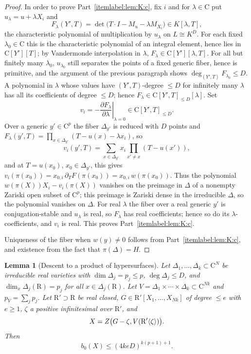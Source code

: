 \documentclass[10pt]{amsart}
\newtheorem{lemma}{Lemma}[section]
\theoremstyle{definition}
\theoremstyle{remark}
\numberwithin{equation}{section}
\newcommand {\R} {\mathrm{R}}
\newcommand {\C}     {\mathrm{C}}
\newcommand {\ZZ} {{\rm Z}}
\newcommand{\Rz}{\R'\langle\zeta\rangle}
\begin{document}
\begin{proof}
In order to prove Part~\eqref{itemlabel:lem:K:c}, fix $i$ and for $\lambda\in\C$ put $u_\lambda=u+\lambda X_i$ and
\[
F_\lambda(Y',T)=\det\bigl(T\cdot I-M_u-\lambda M_{X_i}\bigr)\in K[\lambda,T],
\]
the characteristic polynomial of multiplication by $u_\lambda$ on $L\cong K^D$. For each fixed $\lambda_0\in\C$ this is the characteristic polynomial of an integral element, hence lies in $\C[Y'][T]$; by Vandermonde interpolation in $\lambda$, $F_\lambda\in\C[Y'][\lambda,T]$. For all but finitely many $\lambda_0$, $u_{\lambda_0}$ still separates the points of a fixed generic fiber, hence is primitive, and the argument of the previous paragraph shows $\deg_{(Y',T)}F_{\lambda_0}\le D$. A polynomial in $\lambda$ whose values have $(Y',T)$-degree $\le D$ for infinitely many $\lambda$ has all its coefficients of degree $\le D$; hence $F_\lambda\in\C[Y',T]_{\le D}[\lambda]$. Set
\[
v_i=-\left.\frac{\partial F_\lambda}{\partial\lambda}\right|_{\lambda=0}\in\C[Y',T]_{\le D}.
\]
Over a generic $y'\in\C^p$ the fiber $\Delta_{y'}$ is reduced with $D$ points and $F_\lambda(y',T)=\prod_{x\in\Delta_{y'}}(T-u(x)-\lambda x_i)$, so
\[
v_i(y',T)=\sum_{x\in\Delta_{y'}}x_i\prod_{x'\ne x}(T-u(x')),
\]
and at $T=u(x_0)$, $x_0\in\Delta_{y'}$, this gives $v_i(\pi(x_0))=x_{0,i}\,\partial_TF(\pi(x_0))=x_{0,i}\,w(\pi(x_0))$. Thus the polynomial $w(\pi(X))X_i-v_i(\pi(X))$ vanishes on the preimage in $\Delta$ of a nonempty Zariski open subset of $\C^p$; this preimage is Zariski dense in the irreducible $\Delta$, so the polynomial vanishes on $\Delta$. For real $\lambda$ the fiber over a real generic $y'$ is conjugation-stable and $u_\lambda$ is real, so $F_\lambda$ has real coefficients; hence so do its $\lambda$-coefficients, and $v_i$ is real.
This proves Part~\eqref{itemlabel:lem:K:c}.

Uniqueness of the fiber when $w(y)\ne0$ follows from Part~\eqref{itemlabel:lem:K:c}, and existence from the fact that $\pi(\Delta)=H$. 
\end{proof}

\begin{lemma}[Descent to a product of hypersurfaces]
\label{lem:C}
Let $\Delta_1,\dots,\Delta_k\subset\C^N$ be irreducible real varieties with $\dim\Delta_j=p_j\le p$, $\deg\Delta_j\le D$, and $\dim_x\Delta_j(\R)=p_j$ for all $x\in\Delta_j(\R)$. Let $V=\Delta_1\times\cdots\times\Delta_k\subset\C^{Nk}$ and $p_V=\sum_jp_j$. Let $\R'\supset\R$ be real closed, $G\in\R'[X_1,\dots,X_{Nk}]$ of degree $\le e$ with $e\ge1$, $\zeta$ a positive infinitesimal over $\R'$, and
\[
X=\ZZ\bigl(G-\zeta, V(\Rz)\bigr).
\]
Then 
\[
b_0(X) \leq (4keD)^{k(p+1)+1}.
\]
\end{lemma}
\end{document}
